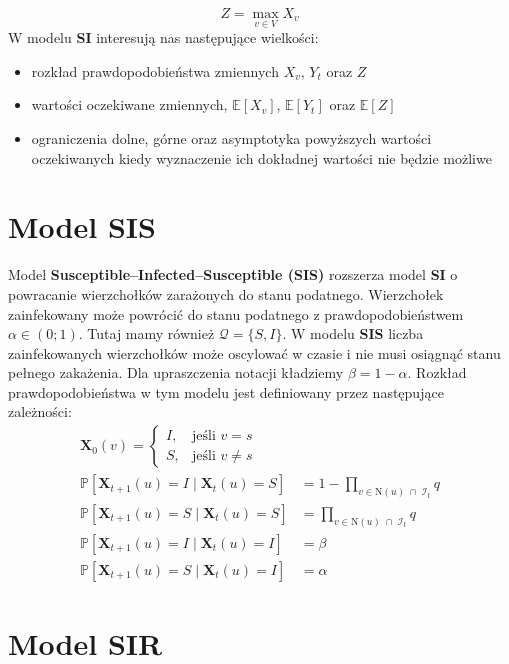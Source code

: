 \[
    Z = \max_{v \in V} X_v
\]
W modelu \textbf{SI} interesują nas następujące wielkości:
\begin{itemize}
    \item rozkład prawdopodobieństwa zmiennych $X_v$, $Y_t$ oraz $Z$
    \item wartości oczekiwane zmiennych, $\mathbb{E}[X_v]$, $\mathbb{E}[Y_t]$ oraz $\mathbb{E}[Z]$
    \item ograniczenia dolne, górne oraz asymptotyka powyższych wartości oczekiwanych kiedy wyznaczenie ich dokładnej wartości nie będzie możliwe
\end{itemize}



\section{Model SIS}

Model \textbf{Susceptible--Infected--Susceptible (SIS)} rozszerza model \textbf{SI} o powracanie wierzchołków zarażonych do stanu podatnego. Wierzchołek zainfekowany może powrócić do stanu podatnego z prawdopodobieństwem $\alpha \in (0;1)$. Tutaj mamy również $\mathcal{Q} = \{S, I\}$.
W modelu \textbf{SIS} liczba zainfekowanych wierzchołków może oscylować w czasie i nie musi osiągnąć stanu pełnego zakażenia. Dla upraszczenia notacji kładziemy $\beta=1-\alpha $.
Rozkład prawdopodobieństwa w tym modelu jest definiowany przez następujące zależności:
\[
\begin{aligned}
\mathbf{X}_0(v) =
\begin{cases}
I, & \text{jeśli } v = s \\[4pt]
S, & \text{jeśli } v \neq s
\end{cases} \\
\mathbb{P}[\mathbf{X}_{t+1}(u) = I \mid \mathbf{X}_t(u) = S]
 &= 1 - \prod_{v \in \mathrm{N}(u) \;\cap\; \mathcal{I}_t} q \\[6pt]
\mathbb{P}[\mathbf{X}_{t+1}(u) = S \mid \mathbf{X}_t(u) = S]
 &= \prod_{v \in \mathrm{N}(u) \;\cap\; \mathcal{I}_t} q \\[6pt]
\mathbb{P}[\mathbf{X}_{t+1}(u) = I \mid \mathbf{X}_t(u) = I]
 &= \beta \\[6pt]
\mathbb{P}[\mathbf{X}_{t+1}(u) = S \mid \mathbf{X}_t(u) = I]
 &= \alpha
\end{aligned}
\]


\section{Model SIR}

